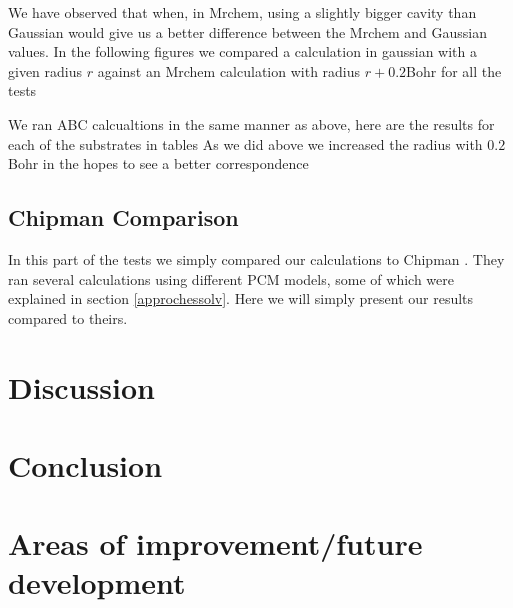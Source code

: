 \documentclass[../master_thesis.tex]{subfiles}
\begin{document}
We have observed that when, in Mrchem,  using a slightly bigger cavity than
Gaussian would give us a better difference between the Mrchem and Gaussian values.
In the following figures we compared a calculation in gaussian with a given radius $r$
against an Mrchem calculation with radius $r + 0.2$Bohr for all the tests

We ran \ac{ABC} calcualtions in the same manner as above, here are the results for
each of the substrates in tables %
As we did above we increased the radius with $0.2$ Bohr in the hopes to see a
better correspondence


\subsection{Chipman Comparison}
In this part of the tests we simply compared our calculations to Chipman \cite{Chipman2002}.
They ran several calculations using different \ac{PCM} models, some of which were
explained in section \ref{approchessolv}. Here we will simply present our results
compared to theirs.


\section{Discussion}
\section{Conclusion}
\section{Areas of improvement/future development}
\end{document}

